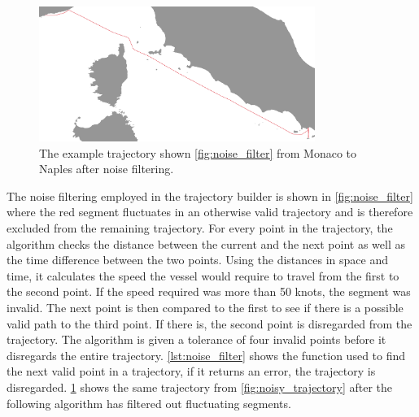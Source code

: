 \begin{figure}[htbp]  %
    \centering
    \includegraphics[width=0.8\textwidth]{figures/trajectory_noise/filtered}
    \caption{The example trajectory shown \cref{fig:noise_filter} from Monaco to Naples after noise filtering.}
    \label{fig:noise_filtered}
\end{figure}

The noise filtering employed in the trajectory builder is shown in \cref{fig:noise_filter} where the red segment fluctuates in an otherwise valid trajectory and is therefore excluded from the remaining trajectory. For every point in the trajectory, the algorithm checks the distance between the current and the next point as well as the time difference between the two points. Using the distances in space and time, it calculates the speed the vessel would require to travel from the first to the second point. If the speed required was more than 50 knots, the segment was invalid. The next point is then compared to the first to see if there is a possible valid path to the third point. If there is, the second point is disregarded from the trajectory. The algorithm is given a tolerance of four invalid points before it disregards the entire trajectory. \cref{lst:noise_filter} shows the function used to find the next valid point in a trajectory, if it returns an error, the trajectory is disregarded. \cref{fig:noise_filtered} shows the same trajectory from \cref{fig:noisy_trajectory} after the following algorithm has filtered out fluctuating segments.

